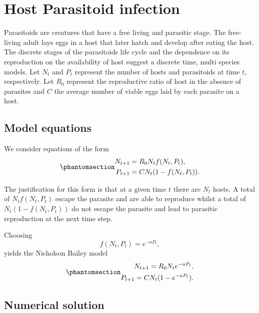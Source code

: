 \documentclass[
  letterpaper,
  DIV=11,
  numbers=noendperiod]{scrreprt}
\begin{document}
\section{Host Parasitoid infection}\label{host-parasitoid-infection}

Parasitoids are creatures that have a free living and parasitic stage.
The free-living adult lays eggs in a host that later hatch and develop
after eating the host. The discrete stages of the parasitoids life cycle
and the dependence on its reproduction on the availability of host
suggest a discrete time, multi species models. Let \(N_{t}\) and \(P_t\)
represent the number of hosts and parasitoids at time \(t\),
respectively. Let \(R_0\) represent the reproductive ratio of host in
the absence of parasites and \(C\) the average number of viable eggs
laid by each parasite on a host.

\subsection{Model equations}\label{model-equations}

We consider equations of the form
\begin{equation}\protect\phantomsection\label{eq-discretetimetwovar}{
\begin{aligned}
N_{t+1}&=R_0N_t f(N_t,P_t), \nonumber \\
P_{t+1}&=CN_t (1- f(N_t,P_t)). \nonumber
\end{aligned}
}\end{equation}

The justification for this form is that at a given time \(t\) there are
\(N_t\) hosts. A total of \(N_t f(N_t,P_t)\) escape the parasite and are
able to reproduce whilst a total of \(N_t(1-f(N_t,P_t))\) do not escape
the parasite and lead to parasitic reproduction at the next time step.

Choosing \[
f(N_t,P_t)=e^{-aP_t},
\] yields the Nicholson Bailey model
\begin{equation}\protect\phantomsection\label{eq-nichbail}{
\begin{aligned}
N_{t+1}=R_0N_t e^{-aP_t}, \nonumber \\
P_{t+1}=CN_t (1- e^{-aP_t}). 
\end{aligned}
}\end{equation}

\subsection{Numerical solution}\label{numerical-solution-1}
\end{document}
